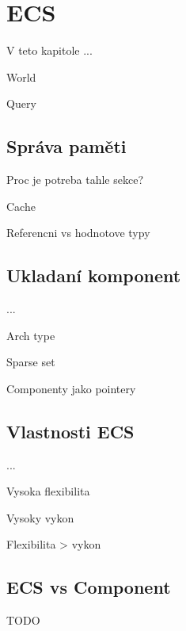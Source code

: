\chapter{ECS}
\label{chap:ecs}
V teto kapitole ...

World

Query

\section{Správa paměti}

Proc je potreba tahle sekce?

Cache

Referencni vs hodnotove typy

\section{Ukladaní komponent}

...

Arch type

Sparse set

Componenty jako pointery

\section{Vlastnosti ECS}

...

Vysoka flexibilita

Vysoky vykon

Flexibilita > vykon

\section{ECS vs Component}

TODO